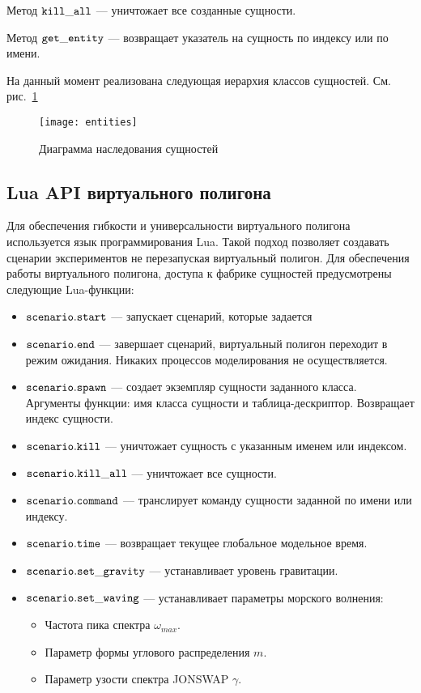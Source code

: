 Метод $\tt kill\_all$ --- уничтожает все созданные сущности.

Метод $\tt get\_entity$ --- возвращает указатель на сущность по индексу или по имени.

На данный момент реализована следующая иерархия классов сущностей. См. рис.~\ref{entities}

\begin{figure}[ht]
\begin{center}
\texttt{[image: entities]}
\end{center}
\caption{Диаграмма наследования сущностей}
\label{entities}
\end{figure}

%

\subsection{Lua API виртуального полигона}

Для обеспечения гибкости и универсальности виртуального полигона используется язык программирования Lua.
Такой подход позволяет создавать сценарии экспериментов  не перезапуская виртуальный полигон.
Для обеспечения работы виртуального полигона, доступа к фабрике сущностей предусмотрены следующие Lua-функции:

\begin{itemize}
\item $\tt scenario.start$ --- запускает сценарий, которые задается 	
\item $\tt scenario.end$ --- завершает сценарий, виртуальный полигон переходит в 
режим ожидания. Никаких процессов моделирования не осуществляется.
\item $\tt scenario.spawn$ --- создает экземпляр сущности заданного класса. Аргументы функции: имя класса сущности и таблица-дескриптор. Возвращает индекс сущности.
\item $\tt scenario.kill$ --- уничтожает сущность с указанным именем или индексом.
\item $\tt scenario.kill\_all$ --- уничтожает все сущности.
\item $\tt scenario.command$ --- транслирует команду сущности заданной по имени или индексу.
\item $\tt scenario.time$ --- возвращает текущее глобальное модельное время.
\item $\tt scenario.set\_gravity$ --- устанавливает уровень гравитации.
\item $\tt scenario.set\_waving$ --- устанавливает параметры морского волнения:
	\begin{itemize}
	\item Частота пика спектра $\omega_{max}$.
	\item Параметр формы углового распределения $m$.
	\item Параметр узости спектра JONSWAP $\gamma$.
	\end{itemize}
\end{itemize}


